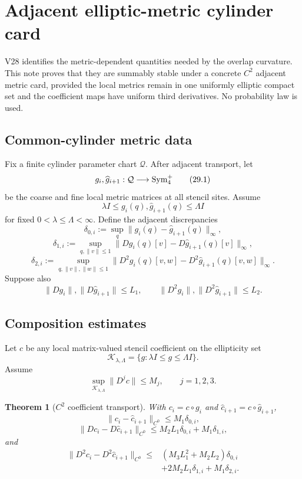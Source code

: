 \documentclass[11pt]{article}
\newtheorem{theorem}{Theorem}[section]
\begin{document}
\section{Adjacent elliptic-metric cylinder card}
\label{sec:v11v29}

V28 identifies the metric-dependent quantities needed by the overlap
curvature.  This note proves that they are summably stable under a
concrete \(C^2\) adjacent metric card, provided the local metrics remain
in one uniformly elliptic compact set and the coefficient maps have
uniform third derivatives.  No probability law is used.

\subsection{Common-cylinder metric data}

Fix a finite cylinder parameter chart \(\mathcal Q\).  After adjacent
transport, let
\[
 g_i,\widehat g_{i+1}:\mathcal Q\longrightarrow
 {\rm Sym}^+_4
 \tag{29.1}
\]
be the coarse and fine local metric matrices at all stencil sites.
Assume
\[
 \lambda I\leq g_i(q),\widehat g_{i+1}(q)\leq\Lambda I
 \tag{29.2}
\]
for fixed \(0<\lambda\leq\Lambda<\infty\).  Define the adjacent
discrepancies
\[
 \delta_{0,i}:=
 \sup_q\|g_i(q)-\widehat g_{i+1}(q)\|_\infty,
 \tag{29.3}
\]
\[
 \delta_{1,i}:=
 \sup_{q,\|v\|\leq1}
 \|Dg_i(q)[v]-D\widehat g_{i+1}(q)[v]\|_\infty,
 \tag{29.4}
\]
\[
 \delta_{2,i}:=
 \sup_{q,\|v\|,\|w\|\leq1}
 \|D^2g_i(q)[v,w]
   -D^2\widehat g_{i+1}(q)[v,w]\|_\infty.
 \tag{29.5}
\]
Suppose also
\[
 \|Dg_i\|,\|D\widehat g_{i+1}\|\leq L_1,\qquad
 \|D^2g_i\|,\|D^2\widehat g_{i+1}\|\leq L_2.
 \tag{29.6}
\]

\subsection{Composition estimates}

Let \(c\) be any local matrix-valued stencil coefficient on the
ellipticity set
\[
 \mathcal K_{\lambda,\Lambda}
 =
 \{g:\lambda I\leq g\leq\Lambda I\}.
 \tag{29.7}
\]
Assume
\[
 \sup_{\mathcal K_{\lambda,\Lambda}}\|D^jc\|\leq M_j,
 \qquad j=1,2,3.
 \tag{29.8}
\]

\begin{theorem}[\(C^2\) coefficient transport]
\label{thm:v11v29-composition}
With \(c_i=c\circ g_i\) and
\(\widehat c_{i+1}=c\circ\widehat g_{i+1}\),
\[
 \|c_i-\widehat c_{i+1}\|_{C^0}
 \leq M_1\delta_{0,i},
 \tag{29.9}
\]
\[
 \|Dc_i-D\widehat c_{i+1}\|_{C^0}
 \leq
 M_2L_1\delta_{0,i}+M_1\delta_{1,i},
 \tag{29.10}
\]
and
\[
 \begin{split}
 \|D^2c_i-D^2\widehat c_{i+1}\|_{C^0}
 \leq{}&
 (M_3L_1^2+M_2L_2)\delta_{0,i}\\
 &+2M_2L_1\delta_{1,i}
 +M_1\delta_{2,i}.
 \end{split}
 \tag{29.11}
\]
\end{theorem}
\end{document}
